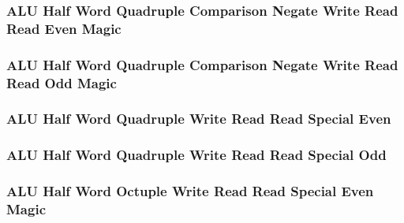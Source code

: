 

\subsubsection[{\small ALU Half Word Quadruple Comparison Negate Write Read Read Even Magic}]{ALU Half Word Quadruple Comparison Negate Write Read Read Even Magic} \label{sec:format-ALU-HQCNWRRE.M}



\subsubsection[{\small ALU Half Word Quadruple Comparison Negate Write Read Read Odd Magic}]{ALU Half Word Quadruple Comparison Negate Write Read Read Odd Magic} \label{sec:format-ALU-HQCNWRRO.M}



\subsubsection[{\small ALU Half Word Quadruple Write Read Read Special Even}]{ALU Half Word Quadruple Write Read Read Special Even} \label{sec:format-ALU-HQWRRSE}



\subsubsection[{\small ALU Half Word Quadruple Write Read Read Special Odd}]{ALU Half Word Quadruple Write Read Read Special Odd} \label{sec:format-ALU-HQWRRSO}



\subsubsection[{\small ALU Half Word Octuple Write Read Read Special Even Magic}]{ALU Half Word Octuple Write Read Read Special Even Magic} \label{sec:format-ALU-HQWRRSE.M}

